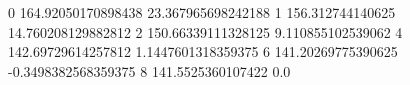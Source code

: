 0 164.92050170898438 23.367965698242188
1 156.312744140625 14.760208129882812
2 150.66339111328125 9.110855102539062
4 142.69729614257812 1.1447601318359375
6 141.20269775390625 -0.3498382568359375
8 141.5525360107422 0.0

